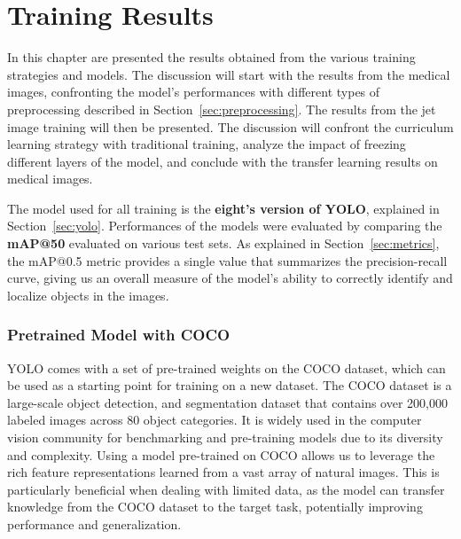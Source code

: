 \chapter{Training Results}
\label{cap:results}

In this chapter are presented the results obtained from the various training strategies and models. The discussion will start with the results from the medical images, confronting the model's performances with different types of preprocessing described in Section~\ref{sec:preprocessing}. The results from the jet image training will then be presented. The discussion will confront the curriculum learning strategy with traditional training, analyze the impact of freezing different layers of the model, and conclude with the transfer learning results on medical images.

The model used for all training is the \textbf{eight's version of YOLO}, explained in Section~\ref{sec:yolo}. 
Performances of the models were evaluated by comparing the \textbf{mAP@50} evaluated on various test sets.
As explained in Section~\ref{sec:metrics}, the mAP@0.5 metric provides a single value that summarizes the precision-recall curve, giving us an overall measure of the model's ability to correctly identify and localize objects in the images.

\subsection*{Pretrained Model with COCO}
YOLO comes with a set of pre-trained weights on the COCO dataset, which can be used as a starting point for training on a new dataset. The COCO dataset is a large-scale object detection, and segmentation dataset that contains over 200,000 labeled images across 80 object categories. It is widely used in the computer vision community for benchmarking and pre-training models due to its diversity and complexity.
Using a model pre-trained on COCO allows us to leverage the rich feature representations learned from a vast array of natural images. This is particularly beneficial when dealing with limited data, as the model can transfer knowledge from the COCO dataset to the target task, potentially improving performance and generalization.

